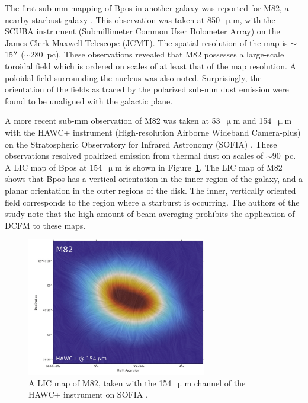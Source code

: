The first sub-mm mapping of \gls{Bpos} in another galaxy was reported for M82, a nearby starbust galaxy \citep{greaves2000magnetic}. This observation was taken at 850~$\upmu$m, with the SCUBA instrument (Submillimeter Common User Bolometer Array) on the James Clerk Maxwell Telescope (JCMT). The spatial resolution of the map is $\sim$15$\operatorname{^{\prime\prime}}$ ($\sim$280~pc). These observations revealed that M82 possesses a large-scale toroidal field which is ordered on scales of at least that of the map resolution. A poloidal field surrounding the nucleus was also noted. Surprisingly, the orientation of the fields as traced by the polarized sub-mm dust emission were found to be unaligned with the galactic plane.

A more recent sub-mm observation of M82 was taken at 53~$\upmu$m and 154~$\upmu$m with the HAWC+ instrument (High-resolution Airborne Wideband Camera-plus) on the Stratospheric Observatory for Infrared Astronomy (SOFIA) \citep{jones2019sofia}. These observations resolved poalrized emission from thermal dust on scales of $\sim$90~pc. A LIC map of \gls{Bpos} at 154~$\upmu$m is shown in Figure~\ref{fig:m82 lic}. The LIC map of M82 shows that \gls{Bpos} has a vertical orientation in the inner region of the galaxy, and a planar orientation in the outer regions of the disk. The inner, vertically oriented field corresponds to the region where a starburst is occurring. The authors of the study note that the high amount of beam-averaging prohibits the application of DCFM to these maps.

\begin{figure}[!htbp]
\centering
\includegraphics[width=0.7\textwidth]{figures/galaxies/m82_lic_cropped}
\caption[~A LIC map of M82, taken with the  channel of the HAWC+ instrument on SOFIA.]{A LIC map of M82, taken with the 154~$\upmu$m channel of the HAWC+ instrument on SOFIA \citep{jones2019sofia}.}
\label{fig:m82 lic}
\end{figure}

